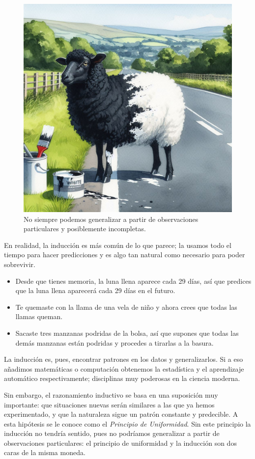 \begin{figure}[ht]
    \centering
    \includegraphics[width=0.8\linewidth]{img/oveja}
    \caption{No siempre podemos generalizar a partir de observaciones
        particulares y posiblemente incompletas.}
\end{figure}

En realidad, la inducción es más común de lo que parece; la usamos todo el
tiempo para hacer predicciones y es algo tan natural como necesario para poder
sobrevivir.
\begin{itemize}
    \item Desde que tienes memoria, la luna llena aparece cada 29 días, así que
          predices que la luna llena aparecerá cada 29 días en el futuro.
    \item Te quemaste con la llama de una vela de niño y ahora crees que todas
          las llamas queman.
    \item Sacaste tres manzanas podridas de la bolsa, así que supones que todas
          las demás manzanas están podridas y procedes a tirarlas a la basura.
\end{itemize}

La inducción es, pues, encontrar patrones en los datos y generalizarlos.
Si a eso añadimos matemáticas o computación obtenemos la estadística y el
aprendizaje automático respectivamente; disciplinas muy poderosas en la ciencia
moderna.

Sin embargo, el razonamiento inductivo se basa en una suposición muy importante:
que situaciones nuevas serán similares a las que ya hemos experimentado, y que
la naturaleza sigue un patrón constante y predecible.
A esta hipótesis se le conoce como el \emph{Principio de Uniformidad}.
Sin este principio la inducción no tendría sentido, pues no podríamos
generalizar a partir de observaciones particulares: el principio de uniformidad
y la inducción son dos caras de la misma moneda.

